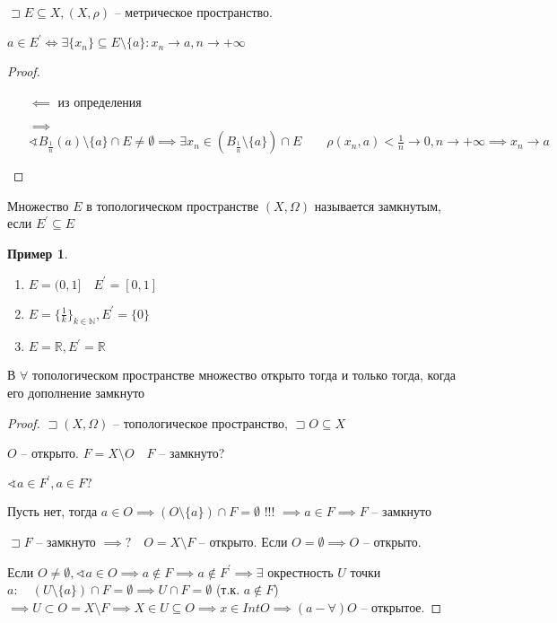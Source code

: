 \documentclass{book}
\newcommand\N{\ensuremath{\mathbb{N}}}
\newcommand\R{\ensuremath{\mathbb{R}}}
\renewcommand\O{\ensuremath{\emptyset}}
\newcommand{\p}[1]{#1^{\prime}}
\theoremstyle{definition}
\newtheorem*{example}{Пример}
\begin{document}
\begin{statement}
    $\sqsupset E\subseteq X, (X, \rho)$ -- метрическое пространство.

    $a\in \p E \iff  \exists \{x_{n} \} \subseteq E\setminus \{a\}: x_{n} \to a, n\to +\infty $
\end{statement}
\begin{proof}
    \begin{itemize}
        \item [$\impliedby $] из определения
        \item [$\implies $] $\sphericalangle B_{\frac{1}{n}}(a)\setminus \{a\} \cap E\neq \O  \implies  \exists x_n\in (B_{\frac{1}{n}}\setminus \{a\})\cap E\qquad \rho(x_{n} , a) <\frac{1}{n} \to 0, n\to +\infty  \implies  x_{n} \to a$
    \end{itemize}
\end{proof}

\begin{definition}
    Множество $E$  в топологическом пространстве  $(X, \Omega)$ называется замкнутым, если $\p E \subseteq E$
\end{definition}
\begin{example}
    \begin{enumerate}
        \item $E = (0,1]\quad \p E = [0,1]$
        \item  $E = \{\frac{1}{k}\}_{k\in \N }, \p E = \{0\}$ 
        \item $E = \R, \p E = \R$
    \end{enumerate}
\end{example}
\begin{theorem}
    В $\forall $ топологическом пространстве множество открыто тогда и только тогда, когда его дополнение замкнуто
\end{theorem}
\begin{proof}
    $\sqsupset (X, \Omega)$ -- топологическое пространство, $\sqsupset O\subseteq X$

    $O$ -- открыто. $F = X\setminus O\quad F$ -- замкнуто?

    $\sphericalangle a\in \p F, a\in F?$

    Пусть нет, тогда $a\in O \implies (O\setminus \{a\})\cap F = \O $ !!! $\implies  a\in F \implies F$ -- замкнуто 

    $\sqsupset F$ -- замкнуто $\implies ?\quad O = X\setminus F$ -- открыто. Если $O = \O  \implies  O$ -- открыто.

    Если $O\neq \O , \sphericalangle a\in O \implies a \not\in F \implies a\not\in \p F \implies \exists $ окрестность $U$ точки $a:\quad \left( U\setminus \{a\} \right) \cap F = \O \implies  U\cap F = \O $ (т.к. $a\not\in F$) $\implies  U\subset O = X\setminus F \implies  X\in U\subseteq O \implies x\in Int O \implies (a-\forall )O $ -- открытое.
\end{proof}
\end{document}
